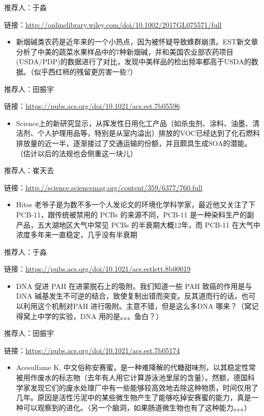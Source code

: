 \documentclass[]{book}
\providecommand{\tightlist}{%
  \setlength{\itemsep}{0pt}\setlength{\parskip}{0pt}}
\begin{document}
推荐人：于淼

链接：\url{http://onlinelibrary.wiley.com/doi/10.1002/2017GL075571/full}

\begin{itemize}
\tightlist
\item
  新烟碱类农药是近年来的一个小热点，因为被怀疑导致蜂群崩溃。EST新文章分析了中美的蔬菜水果样品中的7种新烟碱，并和美国农业部农药项目(USDA/PDP)的数据进行了对比，发现中美样品的检出频率都高于USDA的数据。（似乎西红柿的残留更厉害一些?）
\end{itemize}

推荐人：田振宇

链接：\url{https://pubs.acs.org/doi/10.1021/acs.est.7b05596}

\begin{itemize}
\tightlist
\item
  Science上的新研究显示，从挥发性日用化工产品（如杀虫剂、涂料、油墨、清洁剂、个人护理用品等，特别是从室内溢出）排放的VOC已经达到了化石燃料排放量的近一半，逐渐接过了交通运输的份额，并且颇具生成SOA的潜能。（估计以后的法规也会侧重这一块儿）
\end{itemize}

推荐人：崔天去

链接：\url{http://science.sciencemag.org/content/359/6377/760.full}

\begin{itemize}
\tightlist
\item
  Hites 老爷子是为数不多一个人发论文的环境化学科学家，最近他又关注了下 PCB-11，跟传统被禁用的 PCBs 的来源不同，PCB-11 是一种染料生产的副产品，五大湖地区大气中常见 PCBs 的半衰期大概12年，而 PCB-11 在大气中浓度多年来一直稳定，几乎没有半衰期
\end{itemize}

推荐人：于淼

链接：\url{https://pubs.acs.org/doi/10.1021/acs.estlett.8b00019}

\begin{itemize}
\tightlist
\item
  DNA 促进 PAH 在进蒙脱石上的吸附。我们知道一些 PAH 致癌的作用是与DNA 碱基发生不可逆的结合，致使复制出错而突变。反其道而行的话，也可以利用这个机制对PAH 进行吸附。主意不错，但是这么多DNA 哪来？（窝记得窝上中学的实验，DNA 用的是。。。鱼白？）
\end{itemize}

推荐人：田振宇

链接：\url{https://pubs.acs.org/doi/10.1021/acs.est.7b05174}

\begin{itemize}
\tightlist
\item
  Acesulfame K, 中文俗称安赛蜜，是一种难降解的代糖甜味剂，以其稳定性常被用作废水的标志物（去年有人用它计算游泳池里尿的含量）。然额，德国科学家发现它们的废水处理厂中有一些能够较高效地去除这种物质，时间仅用了几年。原因是活性污泥中的某些微生物产生了能够吃掉安赛蜜的能力，真是一种可以观察到的进化。（另一个脑洞，如果肠道微生物也有了这种能力。。。）
\end{itemize}
\end{document}
